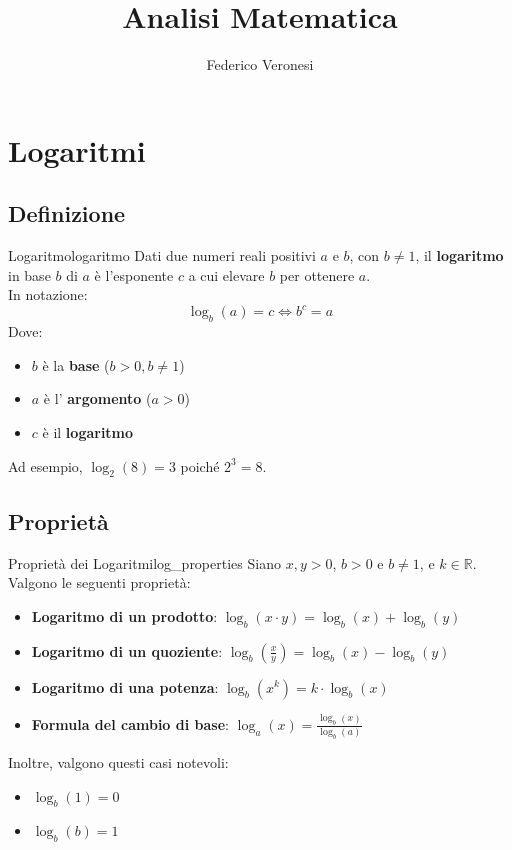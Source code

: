 \documentclass{article}
\title{Analisi Matematica}
\author{Federico Veronesi}
\begin{document}
\maketitle

{
    \hypersetup{linkcolor=black}
    \tableofcontents
}

\section{Logaritmi}

\subsection{Definizione}

\begin{definition}{Logaritmo}{logaritmo}
    Dati due numeri reali positivi $a$ e $b$, con $b \neq 1$, il \textbf{logaritmo} in base $b$ di $a$ è l'esponente $c$ a cui elevare $b$ per ottenere $a$. \\[1em]
    In notazione:
    $$ \log_b(a) = c \iff b^c = a $$
    Dove:
    \begin{itemize}
        \item $b$ è la \textbf{base} ($b > 0, b \neq 1$)
        \item $a$ è l' \textbf{argomento} ($a > 0$)
        \item $c$ è il \textbf{logaritmo}
    \end{itemize}
\end{definition}

Ad esempio, $\log_2(8) = 3$ poiché $2^3 = 8$.

\subsection{Proprietà}

\begin{theorem}{Proprietà dei Logaritmi}{log_properties}
    Siano $x, y > 0$, $b > 0$ e $b \neq 1$, e $k \in \mathbb{R}$. Valgono le seguenti proprietà:
    \begin{itemize}
        \item \textbf{Logaritmo di un prodotto}: $\log_b(x \cdot y) = \log_b(x) + \log_b(y)$
        \item \textbf{Logaritmo di un quoziente}: $\log_b\left(\frac{x}{y}\right) = \log_b(x) - \log_b(y)$
        \item \textbf{Logaritmo di una potenza}: $\log_b(x^k) = k \cdot \log_b(x)$
        \item \textbf{Formula del cambio di base}: $\log_a(x) = \frac{\log_b(x)}{\log_b(a)}$
    \end{itemize}
    Inoltre, valgono questi casi notevoli:
    \begin{itemize}
        \item $\log_b(1) = 0$
        \item $\log_b(b) = 1$
    \end{itemize}
\end{theorem}
\end{document}
